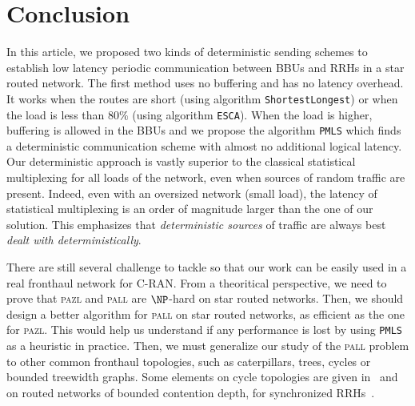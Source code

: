 \documentclass[a4paper,10pt]{article}
\newcommand\shortestlongest{\texttt{ShortestLongest}\xspace}
\newcommand\ESCA{\texttt{ESCA}\xspace}
\newcommand\PMLS{\texttt{PMLS}\xspace}
\newcommand\pazl{\textsc{pazl}\xspace}
\newcommand\pall{\textsc{pall}\xspace}
\begin{document}
 \section{Conclusion}
 
	In this article, we proposed two kinds of deterministic sending schemes to establish low latency periodic communication between BBUs and RRHs in a star routed network. The first method uses no buffering and has no latency overhead. It works when the routes are short (using algorithm \shortestlongest) or when the load is less than $80\%$ (using algorithm \ESCA).  
	When the load is higher, buffering is allowed in the BBUs and we propose the algorithm \PMLS which finds a deterministic communication scheme with almost no additional logical latency.
 	Our deterministic approach is vastly superior to the classical statistical multiplexing for all loads of the network, even when sources of random traffic are present. Indeed, even with an oversized network (small load), the latency of statistical multiplexing is an order of magnitude larger than the one of our solution. This emphasizes that \emph{deterministic sources} of traffic are always best \emph{dealt with deterministically}.  
    
 	There are still several challenge to tackle so that our work can be easily used in a real 
 	fronthaul network for C-RAN.
  	From a theoritical perspective, we need to prove that \pazl and \pall are $\NP$-hard on star routed networks. Then, we should design a better \FPT algorithm for \pall on star routed networks, as efficient as the one for \pazl. This would help us understand if any performance is lost by using \PMLS as a heuristic in practice. Then, we must generalize our study of the \pall problem to other common fronthaul topologies, such as caterpillars, trees, cycles or bounded treewidth graphs. Some elements on cycle topologies are given in~\cite{DBLP:conf/ondm/BarthGS19} and on routed networks of bounded contention depth, for synchronized RRHs~\cite{guiraud2020synchronized}.
\end{document}
